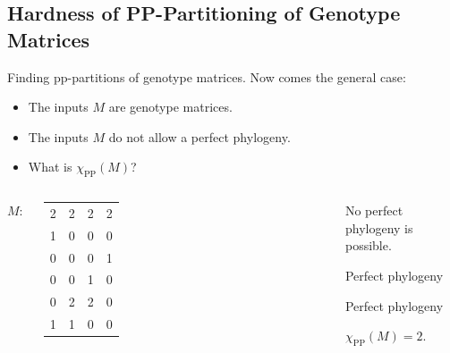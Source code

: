\documentclass{beamer}
\begin{document}
\subsection{Hardness of PP-Partitioning of Genotype Matrices}


\begin{frame}{Finding pp-partitions of genotype matrices.}
  Now comes the general case:
  \begin{itemize}
  \item The inputs $M$ are \alert{genotype matrices}.
  \item The inputs $M$ \alert{do not allow a perfect phylogeny}.
  \item What is $\chi_{\operatorname{PP}}(M)$?
  \end{itemize}
  \begin{example}
    \begin{columns}
      $M\colon$
      \footnotesize
      \begin{tabular}{cccc}
        2 & 2 & 2 & 2 \\
        1 & 0 & 0 & 0 \\
        0 & 0 & 0 & 1 \\
        0 & 0 & 1 & 0 \\
        0 & 2 & 2 & 0 \\
        1 & 1 & 0 & 0 
      \end{tabular}%
      {%
      }
      \begin{overprint}
        No perfect phylogeny is possible.
        
        \textcolor{blue!70!bg}{Perfect phylogeny}
        
        \textcolor{red!70!bg}{Perfect phylogeny}
        
        $\chi_{\operatorname{PP}}(M) = 2$.
        
      \end{overprint}
    \end{columns}
  \end{example}
\end{frame}
\end{document}
